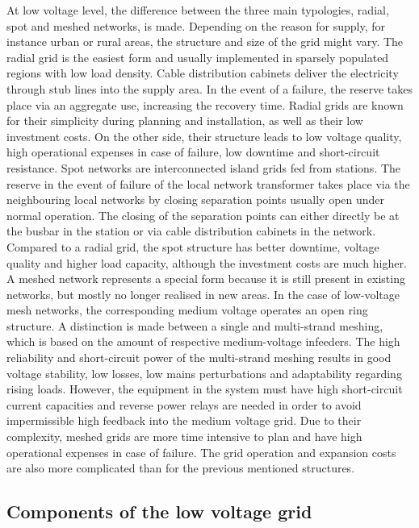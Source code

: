 At low voltage level, the difference between the three main typologies, radial, spot and meshed networks, is made. Depending on the reason for supply, for instance urban or rural areas, the structure and size of the grid might vary. The radial grid is the easiest form and usually implemented in sparsely populated regions with low load density. Cable distribution cabinets deliver the electricity through stub lines into the supply area. In the event of a failure, the reserve takes place via an aggregate use, increasing the recovery time. Radial grids are known for their simplicity during planning and installation, as well as their low investment costs. On the other side, their structure leads to low voltage quality, high operational expenses in case of failure, low downtime and short-circuit resistance. 
Spot networks are interconnected island grids fed from stations. The reserve in the event of failure of the local network transformer takes place via the neighbouring local networks by closing separation points usually open under normal operation. The closing of the separation points can either directly be at the busbar in the station or via cable distribution cabinets in the network. Compared to a radial grid, the spot structure has better downtime, voltage quality and higher load capacity, although the investment costs are much higher. 
A meshed network represents a special form because it is still present in existing networks, but mostly no longer realised in new areas. In the case of low-voltage mesh networks, the corresponding medium voltage operates an open ring structure. A distinction is made between a single and multi-strand meshing, which is based on the amount of respective medium-voltage infeeders. The high reliability and short-circuit power of the multi-strand meshing results in good voltage stability, low losses, low mains perturbations and adaptability regarding rising loads. However, the equipment in the system must have high short-circuit current capacities and reverse power relays are needed in order to avoid impermissible high feedback into the medium voltage grid. Due to their complexity, meshed grids are more time intensive to plan and have high operational expenses in case of failure. The grid operation and expansion costs are also more complicated than for the previous mentioned structures. 

\subsection{Components of the low voltage grid}


